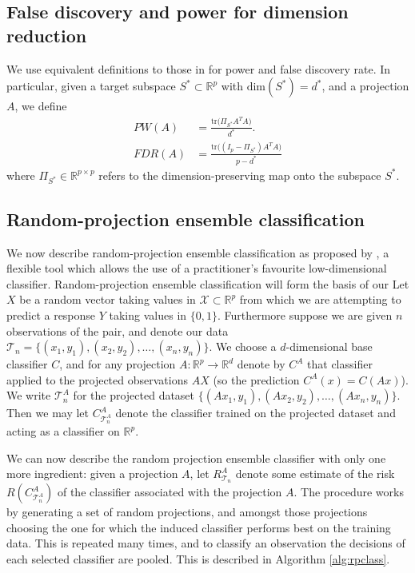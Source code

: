 \documentclass[12pt]{article}
\begin{document}
\subsection{False discovery and power for dimension reduction}
We use equivalent definitions to those in \citet{taeb_false_2020} for power and false discovery rate. In particular, given a target subspace $S^* \subset \mathbb{R}^p$ with $\text{dim}(S^*) = d^*$, and a projection $A$, we define
\begin{align*}
PW(A) & = \frac{\mathrm{tr} \big( \Pi_{S^*} A^TA)}{d^*}. \\
FDR(A) & = \frac{\mathrm{tr} \big( (I_p - \Pi_{S^*}) A^TA\big)}{p - d^*}
\end{align*}
where $\Pi_{S^*} \in \mathbb{R}^{p \times p}$ refers to the dimension-preserving map onto the subspace $S^*$.
\subsection{Random-projection ensemble classification}
We now describe random-projection ensemble classification as proposed by \citet{cannings_random-projection_2017}, a flexible tool which allows the use of a practitioner's favourite low-dimensional classifier. Random-projection ensemble classification will form the basis of our Let $X$ be a random vector taking values in $\mathcal{X} \subset \mathbb{R}^p$ from which we are attempting to predict a response $Y$ taking values in $\{0,1\}$. Furthermore suppose we are given $n$ observations of the pair, and denote our data $\mathcal{T}_n = \{(x_1, y_1), (x_2, y_2), \dots, (x_n, y_n)\}$. We choose a $d$-dimensional base classifier $C$, and for any projection $A:\mathbb{R}^p \rightarrow \mathbb{R}^d$ denote by $C^A$ that classifier applied to the projected observations $AX$ (so the prediction $C^A(x) = C(Ax)$). We write $\mathcal{T}_n^A$ for the projected dataset $\{(Ax_1, y_1), (Ax_2, y_2), \dots, (Ax_n, y_n)\}$. Then we may let $C^A_{\mathcal{T}_n^A}$ denote the classifier trained on the projected dataset and acting as a classifier on $\mathbb{R}^p$. 

We can now describe the random projection ensemble classifier with only one more ingredient: given a projection $A$, let $R^A_{\mathcal{T}_n}$ denote some estimate of the risk $R(C^A_{\mathcal{T}_n^A})$ of the classifier associated with the projection $A$. The procedure works by generating a set of random projections, and amongst those projections choosing the one for which the induced classifier performs best on the training data. This is repeated many times, and to classify an observation the decisions of each selected classifier are pooled. This is described in Algorithm \ref{alg:rpclass}.
\end{document}
